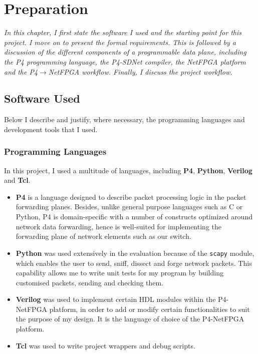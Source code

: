 \chapter{Preparation}
\textit{In this chapter, I first state the software I used and the starting point for this project. I move on to present the formal requirements. This is followed by a discussion of the different components of a programmable data plane, including the P4 programming language, the P4-SDNet compiler, the NetFPGA platform and the P4$\rightarrow$NetFPGA workflow. Finally, I discuss the project workflow.
}

\section{Software Used}
	Below I describe and justify, where necessary, the programming languages and development tools that I used.
	
	\subsection{Programming Languages}
	In this project, I used a multitude of languages, including \textbf{P4}, \textbf{Python}, \textbf{Verilog} and \textbf{Tcl}.
	
	\begin{itemize}
		\item \textbf{P4} is a language designed to describe packet processing logic in the packet forwarding planes. Besides, unlike general purpose languages such as C or Python, P4 is domain-specific with a number of constructs optimized around network data forwarding, hence is well-suited for implementing the forwarding plane of network elements such as our switch.
	
		\item \textbf{Python} was used extensively in the evaluation because of the \texttt{scapy} module, which enables the user to send, sniff, dissect and forge network packets. This capability allows me to write unit tests for my program by building customised packets, sending and checking them.
		
		\item \textbf{Verilog} was used to implement certain HDL modules within the P4-NetFPGA platform, in order to add or modify certain functionalities to suit the purpose of my design. It is the language of choice of the P4-NetFPGA platform.
		
		\item \textbf{Tcl} was used to write project wrappers and debug scripts.
	\end{itemize}

